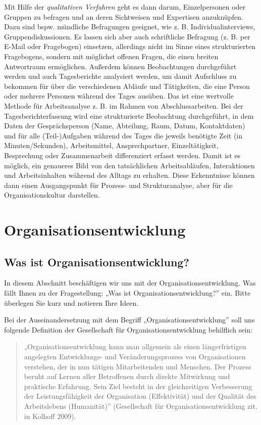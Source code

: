\documentclass[
  letterpaper,
]{book}
\begin{document}
Mit Hilfe der \emph{qualitativen Verfahren} geht es dann darum,
Einzelpersonen oder Gruppen zu befragen und an deren Sichtweisen und
Expertisen anzuknüpfen. Dazu sind bspw. mündliche Befragungen geeignet,
wie z. B. Individualinterviews, Gruppendiskussionen. Es lassen sich aber
auch schriftliche Befragung (z. B. per E-Mail oder Fragebogen)
einsetzen, allerdings nicht im Sinne eines strukturierten Fragebogens,
sondern mit möglichst offenen Fragen, die einen breiten Antwortraum
ermöglichen. Außerdem können Beobachtungen durchgeführt werden und auch
Tagesberichte analysiert werden, um damit Aufschluss zu bekommen für
über die verschiedenen Abläufe und Tätigkeiten, die eine Person oder
mehrere Personen während des Tages ausüben. Das ist eine wertvolle
Methode für Arbeitsanalyse z. B. im Rahmen von Abschlussarbeiten. Bei
der Tagesberichterfassung wird eine strukturierte Beobachtung
durchgeführt, in dem Daten der Gesprächsperson (Name, Abteilung, Raum,
Datum, Kontaktdaten) und für alle (Teil-)Aufgaben während des Tages die
jeweils benötigte Zeit (in Minuten/Sekunden), Arbeitsmittel,
Ansprechpartner, Einzeltätigkeit, Besprechung oder Zusammenarbeit
differenziert erfasst werden. Damit ist es möglich, ein genaueres Bild
von den tatsächlichen Arbeitsabläufen, Interaktionen und Arbeitsinhalten
während des Alltags zu erhalten. Diese Erkenntnisse können dann einen
Ausgangspunkt für Prozess- und Strukturanalyse, aber für die
Organisationskultur darstellen.

\chapter{Organisationsentwicklung}\label{organisationsentwicklung}

\section{Was ist
Organisationsentwicklung?}\label{was-ist-organisationsentwicklung}

In diesem Abschnitt beschäftigen wir uns mit der
Organisationsentwicklung. Was fällt Ihnen zu der Fragestellung: „Was ist
Organisationsentwicklung?'' ein. Bitte überlegen Sie kurz und notieren
Ihre Ideen.

Bei der Auseinandersetzung mit dem Begriff „Organisationsentwicklung''
soll uns folgende Definition der Gesellschaft für
Organisationsentwicklung behilflich sein:

\begin{quote}
„Organisationsentwicklung kann man allgemein als einen längerfristigen
angelegten Entwicklungs- und Veränderungsprozess von Organisationen
verstehen, der in nun tätigen Mitarbeitenden und Menschen. Der Prozess
beruht auf Lernen aller Betroffenen durch direkte Mitwirkung und
praktische Erfahrung. Sein Ziel besteht in der gleichzeitigen
Verbesserung der Leistungsfähigkeit der Organisation (Effektivität) und
der Qualität des Arbeitslebens (Humanität)'' (Gesellschaft für
Organisationsentwicklung zit. in Kolhoff 2009).
\end{quote}
\end{document}

